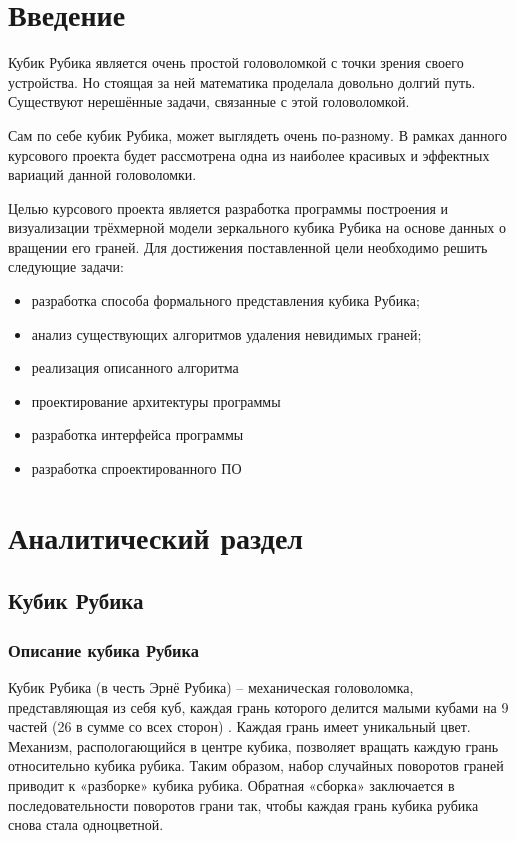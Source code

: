 \documentclass[a4paper, 14pt]{report} %
\begin{document}
	\tableofcontents %
	\chapter{Введение}
	Кубик Рубика является очень простой головоломкой с точки зрения своего устройства. Но стоящая за ней математика проделала довольно долгий путь. Существуют нерешённые задачи, связанные с этой головоломкой.
	
	Сам по себе кубик Рубика, может выглядеть очень по-разному. В рамках данного курсового проекта будет рассмотрена одна из наиболее красивых и эффектных вариаций данной головоломки. 
	
	Целью курсового проекта является разработка программы построения и визуализации трёхмерной модели зеркального кубика Рубика на основе данных о вращении его граней. Для достижения поставленной цели необходимо решить следующие задачи:
	\begin{itemize}
		\item разработка способа формального представления кубика Рубика;
		\item анализ существующих алгоритмов удаления невидимых граней;
		\item реализация описанного алгоритма
		\item проектирование архитектуры программы
		\item разработка интерфейса программы
		\item разработка спроектированного ПО
	\end{itemize}

	\chapter{Аналитический раздел}
	\section{Кубик Рубика}
	\subsection{Описание кубика Рубика}
	Кубик Рубика (в честь Эрнё Рубика) – механическая головоломка, представляющая из себя куб, каждая грань которого делится малыми кубами на 9 частей (26 в сумме со всех сторон) \cite{how_to_assemble}. Каждая грань имеет уникальный цвет. Механизм, распологающийся в центре кубика, позволяет вращать каждую грань относительно кубика рубика. Таким образом, набор случайных поворотов граней приводит к «разборке» кубика рубика. Обратная «сборка» заключается в последовательности поворотов грани так, чтобы каждая грань кубика рубика снова стала одноцветной.
	
\end{document}

